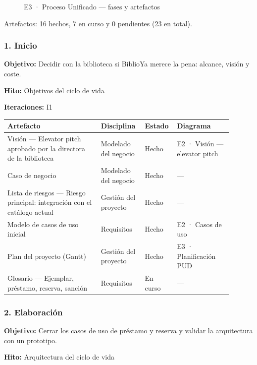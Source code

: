 \begin{figure}[H]
\centering
{}
\caption{E3 · Proceso Unificado — fases y artefactos}
\end{figure}

Artefactos: 16 hechos, 7 en curso y 0 pendientes (23 en total).

\subsubsection*{1. Inicio}

\textbf{Objetivo:} Decidir con la biblioteca si BiblioYa merece la pena: alcance, visión y coste.

\textbf{Hito:} Objetivos del ciclo de vida

\textbf{Iteraciones:} I1

{\small
\begin{longtable}{@{}>{\raggedright\arraybackslash}p{0.393\linewidth}>{\raggedright\arraybackslash}p{0.179\linewidth}>{\raggedright\arraybackslash}p{0.092\linewidth}>{\raggedright\arraybackslash}p{0.234\linewidth}@{}}
\toprule
\textbf{Artefacto} & \textbf{Disciplina} & \textbf{Estado} & \textbf{Diagrama} \\
\midrule
\endhead
Visión — Elevator pitch aprobado por la directora de la biblioteca & Modelado del negocio & Hecho & E2 · Visión — elevator pitch \\
Caso de negocio & Modelado del negocio & Hecho & — \\
Lista de riesgos — Riesgo principal: integración con el catálogo actual & Gestión del proyecto & Hecho & — \\
Modelo de casos de uso inicial & Requisitos & Hecho & E2 · Casos de uso \\
Plan del proyecto (Gantt) & Gestión del proyecto & Hecho & E3 · Planificación PUD \\
Glosario — Ejemplar, préstamo, reserva, sanción & Requisitos & En curso & — \\
\bottomrule
\end{longtable}}

\subsubsection*{2. Elaboración}

\textbf{Objetivo:} Cerrar los casos de uso de préstamo y reserva y validar la arquitectura con un prototipo.

\textbf{Hito:} Arquitectura del ciclo de vida

